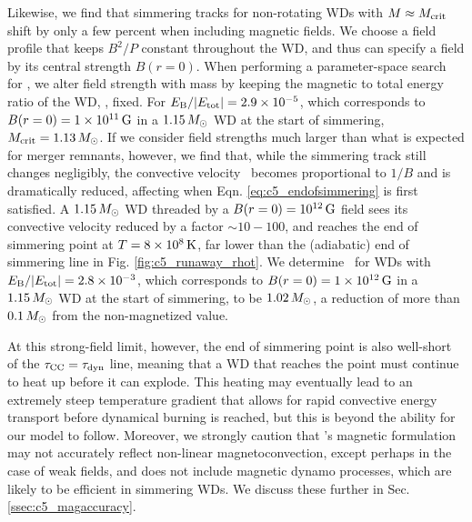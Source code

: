 Likewise, we find that simmering tracks for non-rotating WDs with $M\approx\Mcrit$ shift by only a few percent when including magnetic fields.  We choose a field profile that keeps $B^2/P$ constant throughout the WD, and thus can specify a field by its central strength $B(r=0)$.  When performing a parameter-space search for \Mcrit, we alter field strength with mass by keeping the magnetic to total energy ratio of the WD, \EBEtot, fixed.  For $\EBEtot = 2.9\times10^{-5}$, which corresponds to $B(r=0) = 1\times10^{11}\,\mathrm{G}$ in a $1.15\,\Msun$ WD at the start of simmering, $\Mcrit = 1.13\,\Msun$.  If we consider field strengths much larger than what is expected for merger remnants, however, we find that, while the simmering track still changes negligibly, the convective velocity \vconv\ becomes proportional to $1/B$ and is dramatically reduced, affecting when Eqn. \ref{eq:c5_endofsimmering} is first satisfied.  A $1.15\,\Msun$ WD threaded by a $B(r=0) = 10^{12}\,\mathrm{G}$ field sees its convective velocity reduced by a factor $\sim 10 - 100$, and reaches the end of simmering point at $T = 8\times10^8\,\mathrm{K}$, far lower than the (adiabatic) end of simmering line in Fig. \ref{fig:c5_runaway_rhot}.  We determine \Mcrit\ for WDs with $\EBEtot = 2.8\times10^{-3}$, which corresponds to $B(r=0) = 1\times10^{12}\,\mathrm{G}$ in a $1.15\,\Msun$ WD at the start of simmering, to be $1.02\,\Msun$, a reduction of more than $0.1\,\Msun$ from the non-magnetized value.

At this strong-field limit, however, the end of simmering point is also well-short of the $\taucc = \taudyn$ line, meaning that a WD that reaches the point must continue to heat up before it can explode.  This heating may eventually lead to an extremely steep temperature gradient that allows for rapid convective energy transport before dynamical burning is reached, but this is beyond the ability for our model to follow.  Moreover, we strongly caution that \citeal{stev79}'s magnetic formulation may not accurately reflect non-linear magnetoconvection, except perhaps in the case of weak fields, and does not include magnetic dynamo processes, which are likely to be efficient in simmering WDs.  We discuss these further in Sec. \ref{ssec:c5_magaccuracy}.




